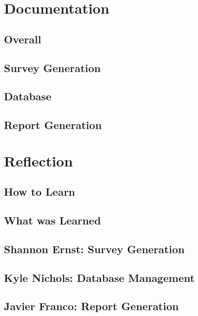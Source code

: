 \documentclass[letterpaper,10pt,serif,draftclsnofoot,onecolumn,compsoc,titlepage]{IEEEtran}
\begin{document}
\section{Documentation}
\subsection{Overall}
\subsection{Survey Generation}
\subsection{Database}
\subsection{Report Generation}
\section{Reflection}
\subsection{How to Learn}
\subsection{What was Learned}
\subsection{Shannon Ernst: Survey Generation}
\subsection{Kyle Nichols: Database Management}
\subsection{Javier Franco: Report Generation}

%
%
\end{document}
